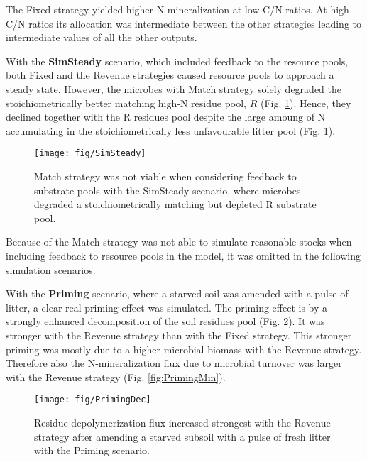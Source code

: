 The Fixed strategy yielded higher N-mineralization at low C/N ratios. At high
C/N ratios its allocation was intermediate between the other strategies leading
to intermediate values of all the other outputs.


With the \textbf{SimSteady} scenario, which included feedback to the
resource pools, both Fixed and the Revenue strategies caused
resource pools to approach a steady state.
However, the microbes with Match strategy solely degraded the
stoichiometrically better matching high-N residue pool, $R$ (Fig.
\ref{fig:SimSteady}). Hence, they declined together with the R residues
pool despite the large amoung of N accumulating in the stoichiometrically less
unfavourable litter pool (Fig. \ref{fig:SimSteady}).

\begin{figure}[t]
\vspace*{2mm}
\begin{center} 
\texttt{[image: fig/SimSteady]} 
\end{center}
\caption{Match strategy was not viable when considering feedback to
substrate pools with the SimSteady scenario, where microbes degraded a
stoichiometrically matching but depleted R substrate pool.
\label{fig:SimSteady}} 
\end{figure}

Because of the Match strategy was not able to simulate reasonable
stocks when including feedback to resource pools in the model, it was omitted
in the following simulation scenarios.

With the \textbf{Priming} scenario, where a starved soil was amended with a
pulse of litter, a clear real priming effect was simulated. The priming effect
is by a strongly enhanced decomposition of the soil residues pool (Fig.
\ref{fig:PrimingDec}). It was stronger with the Revenue strategy than with the
Fixed strategy. This stronger priming was mostly due to a higher microbial
biomass with the Revenue strategy. Therefore also the N-mineralization flux due
to microbial turnover was larger with the Revenue strategy (Fig.
\ref{fig:PrimingMin}).

\begin{figure}[t]
\vspace*{2mm}
\begin{center}
\texttt{[image: fig/PrimingDec]}
\end{center}
\caption{Residue depolymerization flux increased strongest with the Revenue
strategy after amending a starved subsoil with a pulse of fresh litter with the
Priming scenario.
\label{fig:PrimingDec}}
\end{figure}

